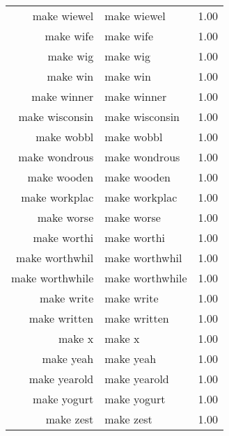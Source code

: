 \begin{table}[ht]
\begin{tabular}{rlr}
  make wiewel & make wiewel & 1.00 \\ 
  make wife & make wife & 1.00 \\ 
  make wig & make wig & 1.00 \\ 
  make win & make win & 1.00 \\ 
  make winner & make winner & 1.00 \\ 
  make wisconsin & make wisconsin & 1.00 \\ 
  make wobbl & make wobbl & 1.00 \\ 
  make wondrous & make wondrous & 1.00 \\ 
  make wooden & make wooden & 1.00 \\ 
  make workplac & make workplac & 1.00 \\ 
  make worse & make worse & 1.00 \\ 
  make worthi & make worthi & 1.00 \\ 
  make worthwhil & make worthwhil & 1.00 \\ 
  make worthwhile & make worthwhile & 1.00 \\ 
  make write & make write & 1.00 \\ 
  make written & make written & 1.00 \\ 
  make x & make x & 1.00 \\ 
  make yeah & make yeah & 1.00 \\ 
  make yearold & make yearold & 1.00 \\ 
  make yogurt & make yogurt & 1.00 \\ 
  make zest & make zest & 1.00 \\ 
   \hline
\end{tabular}
\end{table}
